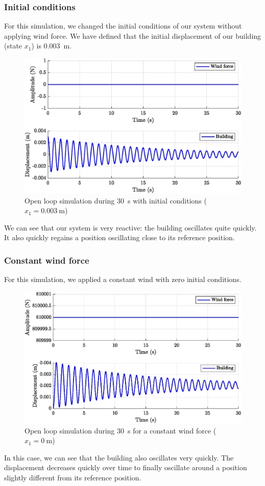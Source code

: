 \subsubsection{Initial conditions}
For this simulation, we changed the initial conditions of our system without applying wind force. We have defined that the initial displacement of our building (state $x_1$) is \SI{0.003}{\meter}.
\begin{figure}[H]
    \centering
    \includegraphics[width=\textwidth]{resources/eps/2_initial-conditions.eps}
    \caption{Open loop simulation during \SI{30}{\second} with initial conditions ($x_1=\SI{0.003}{\meter}$)}
\end{figure}
We can see that our system is very reactive: the building oscillates quite quickly. It also quickly regains a position oscillating close to its reference position.

\subsubsection{Constant wind force}
For this simulation, we applied a constant wind with zero initial conditions.
\begin{figure}[H]
    \centering
    \includegraphics[width=\textwidth]{resources/eps/2_constant-wind.eps}
    \caption{Open loop simulation during \SI{30}{\second} for a constant wind force ($x_1=\SI{0}{\meter}$)}
\end{figure}
In this case, we can see that the building also oscillates very quickly. The displacement decreases quickly over time to finally oscillate around a position slightly different from its reference position.

